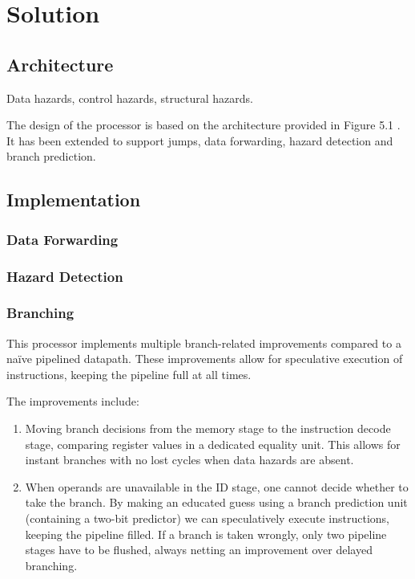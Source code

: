 \chapter{Solution}


\section{Architecture}

Data hazards, control hazards, structural hazards.

The design of the processor is based on the architecture provided in Figure 5.1 \cite[p. 50]{compendium}.
It has been extended to support jumps, data forwarding, hazard detection and branch prediction.

\section{Implementation}

\subsection{Data Forwarding}

\subsection {Hazard Detection}

\subsection{Branching}

This processor implements multiple branch-related improvements compared to a naïve pipelined datapath. These improvements allow for speculative execution of instructions, keeping the pipeline full at all times.

The improvements include:
\begin{enumerate}
  \item
    Moving branch decisions from the memory stage to the instruction decode stage, comparing register values in a dedicated equality unit.
    This allows for instant branches with no lost cycles when data hazards are absent.
  \item
    When operands are unavailable in the ID stage, one cannot decide whether to take the branch.
    By making an educated guess using a branch prediction unit (containing a two-bit predictor) we can speculatively execute instructions, keeping the pipeline filled.
    If a branch is taken wrongly, only two pipeline stages have to be flushed, always netting an improvement over delayed branching.
\end{enumerate}

